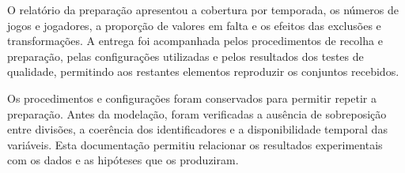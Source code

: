 O relatório da preparação apresentou a cobertura por temporada, os
números de jogos e jogadores, a proporção de valores em falta e os efeitos
das exclusões e transformações. A entrega foi acompanhada pelos
procedimentos de recolha e preparação, pelas configurações utilizadas e
pelos resultados dos testes de qualidade, permitindo aos restantes
elementos reproduzir os conjuntos recebidos.

Os procedimentos e configurações foram conservados para permitir repetir
a preparação. Antes da modelação, foram verificadas a ausência de
sobreposição entre divisões, a coerência dos identificadores e a
disponibilidade temporal das variáveis. Esta documentação permitiu
relacionar os resultados experimentais com os dados e as hipóteses que
os produziram.
